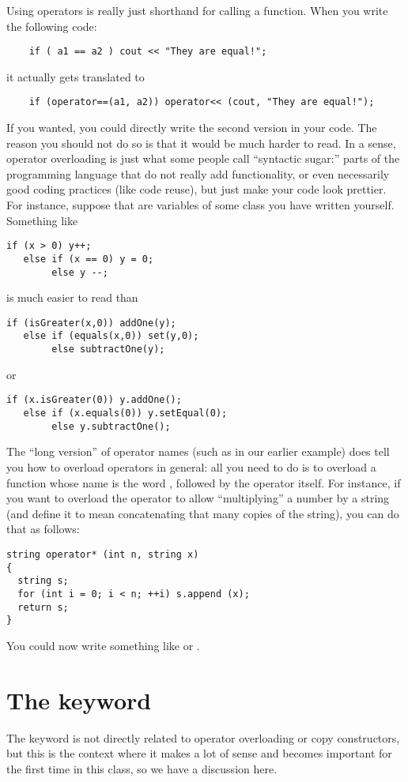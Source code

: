 Using operators is really just shorthand for calling a function.
When you write the following code:
\begin{verbatim}
    if ( a1 == a2 ) cout << "They are equal!";
\end{verbatim}
it actually gets translated to
\begin{verbatim}
    if (operator==(a1, a2)) operator<< (cout, "They are equal!");
\end{verbatim}
If you wanted, you could directly write the second version in your code.
The reason you should not do so is that it would be much harder to read.
In a sense, operator overloading is just what some people call
``syntactic sugar:'' parts of the programming language that do not
really add functionality,
or even necessarily good coding practices (like code reuse),
but just make your code look prettier. 
For instance, suppose that  are variables of some class you
have written yourself. Something like 
\begin{verbatim}
if (x > 0) y++;
   else if (x == 0) y = 0;
        else y --;
\end{verbatim}
is much easier to read than
\begin{verbatim}
if (isGreater(x,0)) addOne(y);
   else if (equals(x,0)) set(y,0);
        else subtractOne(y);
\end{verbatim}
or
\begin{verbatim}
if (x.isGreater(0)) y.addOne();
   else if (x.equals(0)) y.setEqual(0);
        else y.subtractOne();
\end{verbatim}

The ``long version'' of operator names
(such as  in our earlier example)
does tell you how to overload operators in general:
all you need to do is to overload a function whose name is the word
, followed by the operator itself.
For instance, if you want to overload the \code{*} operator to allow
``multiplying'' a number by a string
(and define it to mean concatenating that many copies of the string),
you can do that as follows:
\begin{verbatim}
string operator* (int n, string x)
{
  string s;
  for (int i = 0; i < n; ++i) s.append (x);
  return s;
}
\end{verbatim}

You could now write something like
or .

\section{The  keyword}
The  keyword is not directly related to operator
overloading or copy constructors, but this is the context where it
makes a lot of sense and becomes important for the first time in this
class, so we have a discussion here.

